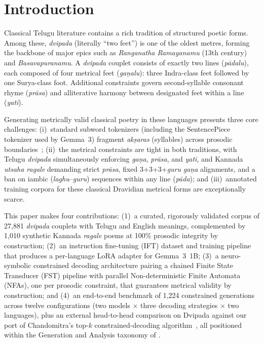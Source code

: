 \documentclass[11pt]{article}
\begin{document}
\section{Introduction}
\label{sec:intro}

Classical Telugu literature contains a rich tradition of structured poetic
forms. Among these, \textit{dvipada} (literally ``two feet'') is one of the
oldest metres, forming the backbone of major epics such as
\textit{Ranganatha Ramayanamu} (13th century) and
\textit{Basavapuranamu}. A \textit{dvipada} couplet consists of exactly two
lines (\textit{p\={a}dalu}), each composed of four metrical feet
(\textit{ga\d{n}alu}): three Indra-class feet followed by one Surya-class
foot. Additional constraints govern second-syllable consonant rhyme
(\textit{pr\={a}sa}) and alliterative harmony between designated feet within
a line (\textit{yati}).

Generating metrically valid classical poetry in these languages presents
three core challenges:
(i)~standard subword tokenizers (including the SentencePiece tokenizer
used by Gemma~3) fragment \textit{ak\d{s}aras} (syllables) across
prosodic boundaries~\citep{sennrich2016};
(ii)~the metrical constraints are tight in both traditions, with Telugu
\textit{dvipada} simultaneously enforcing \textit{ga\d{n}a},
\textit{pr\={a}sa}, and \textit{yati}, and Kannada \textit{utsaha ragale}
demanding strict \textit{pr\={a}sa}, fixed 3+3+3+\textit{guru}
\textit{ga\d{n}a} alignments, and a ban on iambic
(\textit{laghu}--\textit{guru}) sequences within any line
(\textit{p\={a}da});
and (iii)~annotated training corpora for these classical Dravidian
metrical forms are exceptionally scarce.

This paper makes four contributions: (1)~a curated, rigorously validated
corpus of 27,881 \textit{dvipada} couplets with Telugu and English
meanings, complemented by 1,010 synthetic Kannada \textit{ragale} poems
at 100\% prosodic integrity by construction; (2)~an instruction
fine-tuning (IFT) dataset and training pipeline that produces a per-language
LoRA adapter for Gemma~3~1B; (3)~a neuro-symbolic constrained decoding
architecture pairing a chained Finite State Transducer (FST) pipeline with
parallel Non-deterministic Finite Automata (NFAs), one per prosodic
constraint, that guarantees metrical validity by construction; and (4)~an
end-to-end benchmark of 1{,}224 constrained generations across twelve
configurations (two models $\times$ three decoding strategies $\times$ two
languages), plus an external head-to-head comparison on Dvipada against our port
of Chandomitra's top-$k$ constrained-decoding
algorithm~\citep{jagadeeshan2026chandomitra}, all positioned within
the Generation and Analysis taxonomy of \citet{Kranti2024}.
\end{document}
